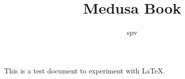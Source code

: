 \documentclass{article}
\title{Medusa Book}
\author{spv}
\begin{document}
	\maketitle

	This is a test document to experiment with \LaTeX.
\end{document}
